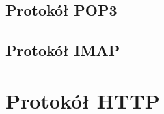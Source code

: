 \documentclass{article}
\begin{document}
\subsection*{Protokół POP3}
\subsection*{Protokół IMAP}

\newpage 
\section{Protokół HTTP}

\newpage 

\end{document}
